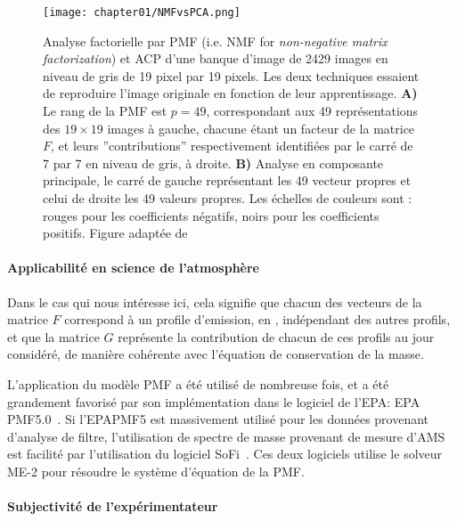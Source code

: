\begin{figure}[ht]
    \centering
    \texttt{[image: chapter01/NMFvsPCA.png]}
    \caption{Analyse factorielle par PMF (i.e. NMF for \textit{non-negative matrix
    factorization}) et ACP d'une banque d'image de 2429 images en niveau de gris de 19
    pixel par 19 pixels. Les deux techniques essaient de reproduire l'image originale en
    fonction de leur apprentissage.
    \textbf{A)} Le rang de la PMF est $p=49$, correspondant aux 49
    représentations des $19\times19$ images à gauche, chacune étant un facteur de la
    matrice $F$, et leurs ''contributions'' respectivement identifiées par le carré de 7 par
    7 en niveau de gris, à droite.
    \textbf{B)} Analyse en composante principale, le carré de gauche représentant les 49
    vecteur propres et celui de droite les 49 valeurs propres.
    Les échelles de couleurs sont : rouges pour les coefficients négatifs, noirs pour les
    coefficients positifs.
    Figure adaptée de \textcite{leeLearning1999}}%
    \label{fig:chapter01/NMFvsPCA}
\end{figure}

\paragraph{Applicabilité en science de l'atmosphère}%
\label{par:applicabilité_en_science_de_l_atmosphère}

Dans le cas qui nous intéresse ici, cela signifie que chacun des vecteurs de la matrice
$F$ correspond à un profile d'emission, en \si{\ugm}, indépendant des autres profils, et
que la matrice $G$ représente la contribution de chacun de ces profils au jour
considéré, de manière cohérente avec l'équation de conservation de la masse.

L'application du modèle PMF a été utilisé de nombreuse fois, et a été grandement favorisé
par son implémentation dans le logiciel de l'EPA: EPA PMF5.0~\autocite{norrisEPA2014}.
Si l'EPAPMF5 est massivement utilisé pour les données provenant d'analyse de
filtre, l'utilisation de spectre de masse provenant de mesure d'AMS est facilité par
l'utilisation du logiciel SoFi~\autocite{canonacoSoFi2013}. Ces deux logiciels utilise le
solveur ME-2 pour résoudre le système d'équation de la PMF.

\paragraph{Subjectivité de l'expérimentateur}%
\label{par:subjectivité_de_l_expérimentateur}

